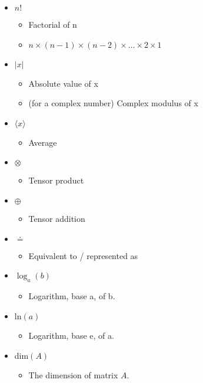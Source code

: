 \begin{itemize}
\item $n!$
\begin{itemize}
\item Factorial of n
\item $n \times (n-1) \times (n-2) \times \ldots \times 2 \times 1$
\end{itemize}

\item $|x|$
\begin{itemize}
\item Absolute value of x
\item (for a complex number) Complex modulus of x
\end{itemize}

\item $\langle x\rangle$
\begin{itemize}
\item Average
\end{itemize}

\item $\otimes$
\begin{itemize}
\item Tensor product
\end{itemize}

\item $\oplus$
\begin{itemize}
\item Tensor addition
\end{itemize}

\item $\doteq$
\begin{itemize}
\item Equivalent to / represented as
\end{itemize}

\item $\log_a(b)$
\begin{itemize}
\item Logarithm, base a, of b.
\end{itemize}

\item ln$(a)$
\begin{itemize}
\item Logarithm, base e, of a.
\end{itemize}

\item dim$(A)$
\begin{itemize}
\item The dimension of matrix $A$.
\end{itemize}


\end{itemize}
